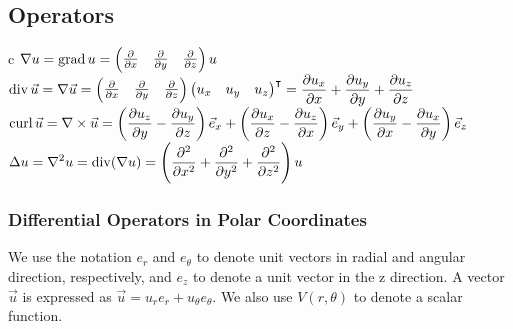 \documentclass{article}
\begin{document}
\begin{twocolumn}
\subsection{Operators}

\begin{center}
	\begin{mtabular}{c}
		$\displaystyle \nabla u = \operatorname{grad} u = \begin{pmatrix} \frac{\partial }{\partial x} & \frac{\partial }{\partial y} & \frac{\partial }{\partial z}  \end{pmatrix} u$ \\
		$\displaystyle \operatorname{div} \vec u = \nabla \vec u = \begin{pmatrix} \frac{\partial }{\partial x} & \frac{\partial }{\partial y} & \frac{\partial }{\partial z} \end{pmatrix} \begin{pmatrix} u_x & u_y & u_z	\end{pmatrix}^\intercal = \frac{\partial u_x}{\partial x} + \frac{\partial u_y}{\partial y} + \frac{\partial u_z}{\partial z}$\\
		$\displaystyle \operatorname{curl} \vec u = \nabla \times \vec u = \left( \frac{\partial u_z}{\partial y} - \frac{\partial u_y}{\partial z} \right) \vec e_x + \left( \frac{\partial u_x}{\partial z} - \frac{\partial u_z}{\partial x} \right) \vec e_y + \left( \frac{\partial u_y}{\partial x} - \frac{\partial u_x}{\partial y} \right) \vec e_z $\\
		$\displaystyle \Delta u = \nabla^2 u = \operatorname{div}(\nabla u) =  \left(\frac{\partial^2 }{\partial x ^2} + \frac{\partial^2 }{\partial y ^2} + \frac{\partial^2 }{\partial z ^2}\right) u$
	\end{mtabular}
\end{center}

\subsubsection{Differential Operators in Polar Coordinates}

We use the notation $e_r$ and $e_\theta$ to denote unit vectors in radial and angular direction, respectively, and $e_z$ to denote a unit vector in the z direction. A vector $\vec u$ is expressed as $\vec u = u_r e_r + u_\theta e_\theta$. We also use $V(r,\theta)$ to denote a scalar function.


\end{twocolumn}
\end{document}
